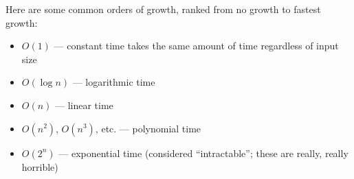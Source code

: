 Here are some common orders of growth, ranked from no growth to fastest growth:
\begin{itemize}
\item $O(1)$ --- constant time takes the same amount of time regardless of
  input size
\item $O(\log n)$ --- logarithmic time
\item $O(n)$ --- linear time
\item $O(n^2)$, $O(n^3)$, etc. --- polynomial time
\item $O(2^n)$ --- exponential time (considered ``intractable''; these are
    really, really horrible)
\end{itemize}
